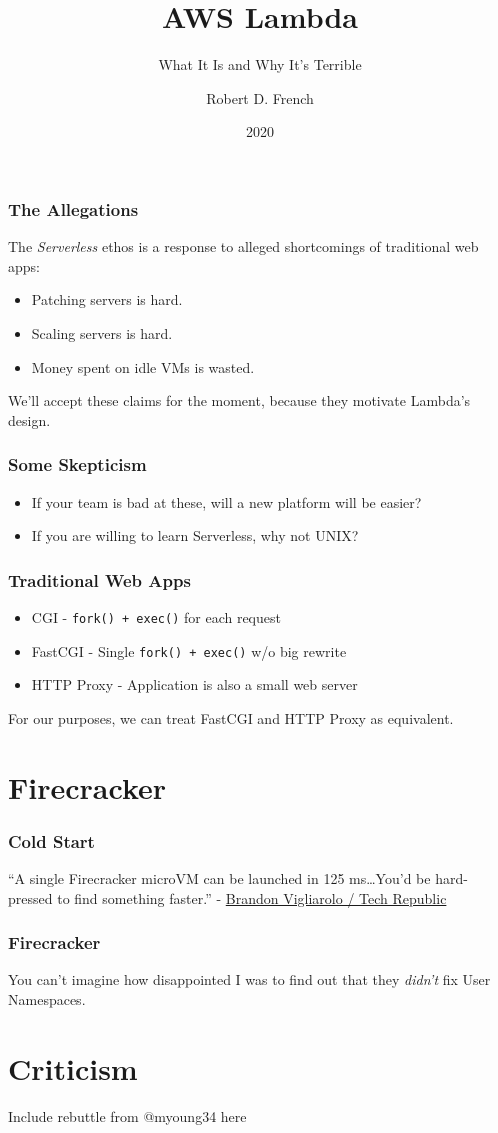 \documentclass{beamer}
\title{AWS Lambda}
\subtitle{What It Is and Why It's Terrible}
\author{Robert D. French}
\institute{Old Man Yells at Cloud, Inc.}
\date{2020}
\begin{document}
\frame{\titlepage}

\begin{frame}
	\frametitle{The Allegations}
	The \emph{Serverless} ethos is a response to alleged shortcomings of traditional
	web apps:
	\begin{itemize}
		\pause \item Patching servers is hard.
		\pause \item Scaling servers is hard.
		\pause \item Money spent on idle VMs is wasted.
	\end{itemize}
	\pause
	We'll accept these claims for the moment, because they motivate Lambda's design.
\end{frame}

\begin{frame}
	\frametitle{Some Skepticism}
	\begin{itemize}
		\item If your team is bad at these, will a new platform will be easier?
		\pause \item If you are willing to learn Serverless, why not UNIX?
	\end{itemize}
\end{frame}

\begin{frame}
	\frametitle{Traditional Web Apps}
	\begin{itemize}
		\pause \item CGI - \texttt{fork() + exec()} for each request
		\pause \item FastCGI - Single \texttt{fork() + exec()} w/o big rewrite
		\pause \item HTTP Proxy - Application is also a small web server
	\end{itemize}
	\pause For our purposes, we can treat FastCGI and HTTP Proxy as equivalent.
\end{frame}
 
\section{Firecracker}
\frame{\sectionpage}

\begin{frame}
	\frametitle{Cold Start}
	``A single Firecracker microVM can be launched in 125 ms\ldots You'd be
	hard-pressed to find something faster.''
	- \href{https://www.techrepublic.com/article/aws-firecracker-10-things-every-tech-pro-should-know/}{Brandon Vigliarolo / Tech Republic}
\end{frame}

\begin{frame}
	\frametitle{Firecracker}
	You can't imagine how disappointed I was to find out that they \emph{didn't} fix
	User Namespaces.
\end{frame}
 
\section{Criticism}
\frame{\sectionpage}

\begin{frame}
	Include rebuttle from @myoung34 here
\end{frame}
\end{document}

